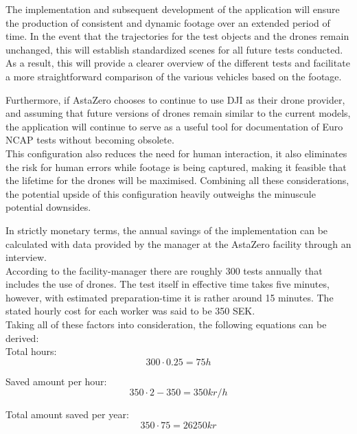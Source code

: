 The implementation and subsequent development of the application will ensure the production of consistent and dynamic footage over an extended period of time. In the event that the trajectories for the test objects and the drones remain unchanged, this will establish standardized scenes for all future tests conducted. As a result, this will provide a clearer overview of the different tests and facilitate a more straightforward comparison of the various vehicles based on the footage.

Furthermore, if AstaZero chooses to continue to use DJI as their drone provider, and assuming that future versions of drones remain similar to the current models, the application will continue to serve as a useful tool for documentation of Euro NCAP tests without becoming obsolete. 
\\

This configuration also reduces the need for human interaction, it also eliminates the risk for human errors while footage is being captured, making it feasible that the lifetime for the drones will be maximised. Combining all these considerations, the potential upside of this configuration heavily outweighs the minuscule potential downsides. 

In strictly monetary terms, the annual savings of the implementation can be calculated with data provided by the manager at the AstaZero facility through an interview. 
\\

According to the facility-manager there are roughly 300 tests annually that includes the use of drones. The test itself in effective time takes five minutes, however, with estimated preparation-time it is rather around 15 minutes. The stated hourly cost for each worker was said to be 350 SEK. 
\\

Taking all of these factors into consideration, the following equations can be derived:
\\

Total hours:
\begin{equation}
    300 \cdot 0.25 = 75 h
\end{equation}

Saved amount per hour:
\begin{equation}
    350 \cdot 2 - 350 = 350kr/h
\end{equation}

Total amount saved per year:
\begin{equation}
    350 \cdot 75 = 26250kr
\end{equation}


